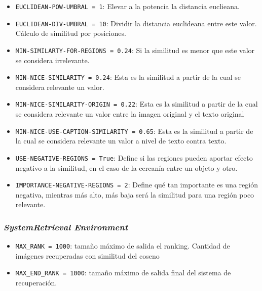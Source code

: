\begin{itemize}
\item \verb|EUCLIDEAN-POW-UMBRAL = 1|: Elevar a la potencia la distancia euclieana.
\item \verb|EUCLIDEAN-DIV-UMBRAL = 10|: Dividir la distancia euclideana entre este valor. C\'alculo de similitud por posiciones. 
\item \verb|MIN-SIMILARTY-FOR-REGIONS = 0.24|: Si la similitud es menor que este valor se considera irrelevante.
\item \verb|MIN-NICE-SIMILARITY = 0.24|: Esta es la similitud a partir de la cual se considera relevante un valor.
\item \verb|MIN-NICE-SIMILARITY-ORIGIN = 0.22|: Esta es la similitud a partir de la cual se considera relevante un valor entre la imagen original y el texto original
\item \verb|MIN-NICE-USE-CAPTION-SIMILARITY = 0.65|: Esta es la similitud a partir de la cual se considera relevante un valor a nivel de texto contra texto.
\item \verb|USE-NEGATIVE-REGIONS = True|: Define si las regiones pueden aportar efecto negativo a la similitud, en el caso de la cercan\'ia entre un objeto y otro.
\item \verb|IMPORTANCE-NEGATIVE-REGIONS = 2|: Define qu\'e tan importante es una regi\'on negativa, mientras m\'as alto, m\'as baja ser\'a la similitud para una regi\'on poco relevante.
\end{itemize}

\subsubsection*{\textit{SystemRetrieval Environment}}
    \begin{itemize}
    \item \verb|MAX_RANK = 1000|: tamaño m\'aximo de salida el ranking. Cantidad de im\'agenes recuperadas con similitud del coseno
    \item \verb|MAX_END_RANK = 1000|: tamaño m\'aximo de salida final del sistema de recuperaci\'on.
    \end{itemize}
